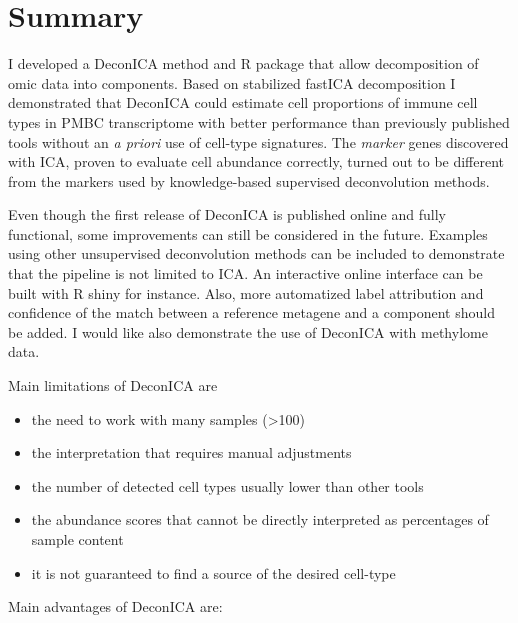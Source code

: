 \documentclass[12pt,]{book}
\providecommand{\tightlist}{%
  \setlength{\itemsep}{0pt}\setlength{\parskip}{0pt}}
\theoremstyle{definition}
\theoremstyle{definition}
\theoremstyle{definition}
\theoremstyle{remark}
\begin{document}
\hypertarget{summary-4}{%
\section{Summary}\label{summary-4}}

I developed a DeconICA method and R package that allow decomposition of
omic data into components. Based on stabilized fastICA decomposition I
demonstrated that DeconICA could estimate cell proportions of immune
cell types in PMBC transcriptome with better performance than previously
published tools without an \emph{a priori} use of cell-type signatures.
The \emph{marker} genes discovered with ICA, proven to evaluate cell
abundance correctly, turned out to be different from the markers used by
knowledge-based supervised deconvolution methods.

Even though the first release of DeconICA is published online
\citep{Czerwinska2018} and fully functional, some improvements can still
be considered in the future. Examples using other unsupervised
deconvolution methods can be included to demonstrate that the pipeline
is not limited to ICA. An interactive online interface can be built with
R shiny for instance. Also, more automatized label attribution and
confidence of the match between a reference metagene and a component
should be added. I would like also demonstrate the use of DeconICA with
methylome data.

Main limitations of DeconICA are

\begin{itemize}
\tightlist
\item
  the need to work with many samples (\textgreater{}100)
\item
  the interpretation that requires manual adjustments
\item
  the number of detected cell types usually lower than other tools
\item
  the abundance scores that cannot be directly interpreted as
  percentages of sample content
\item
  it is not guaranteed to find a source of the desired cell-type
\end{itemize}

Main advantages of DeconICA are:
\end{document}

